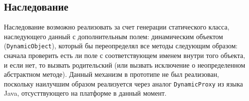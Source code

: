 \documentclass[times,specification,annotation]{itmo-student-thesis}
\begin{document}
\subsection{Наследование}
Наследование возможно реализовать за счет генерации статического класса, наследующего данный с дополнительным полем: динамическим объектом (\texttt{DynamicObject}), который бы переопределял все методы следующим образом: сначала проверить есть ли поле с соответствующем именем внутри того объекта, и если нет, то вызвать родительский (или вызвать исключение о неопределенном абстрактном методе). Данный механизм в прототипе не был реализован, поскольку наилучшим образом реализуется через аналог \texttt{DynamicProxy} из языка Java, отсусттвующего на платформе в данный момент.
\end{document}
